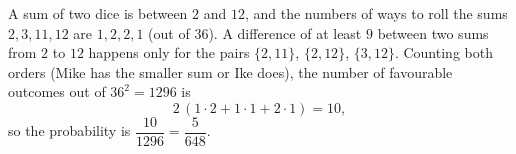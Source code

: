 A sum of two dice is between $2$ and $12$, and the numbers of ways to roll the sums $2,3,11,12$ are $1,2,2,1$ (out of $36$). A difference of at least $9$ between two sums from $2$ to $12$ happens only for the pairs $\{2,11\}$, $\{2,12\}$, $\{3,12\}$. Counting both orders (Mike has the smaller sum or Ike does), the number of favourable outcomes out of $36^2=1296$ is
\[
2\,(1\cdot2+1\cdot1+2\cdot1)=10,
\]
so the probability is $\dfrac{10}{1296}=\boxed{\dfrac{5}{648}}$.
